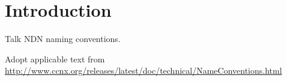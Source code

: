 \section{Introduction}
Talk NDN naming conventions.

Adopt applicable text from 
\url{http://www.ccnx.org/releases/latest/doc/technical/NameConventions.html}